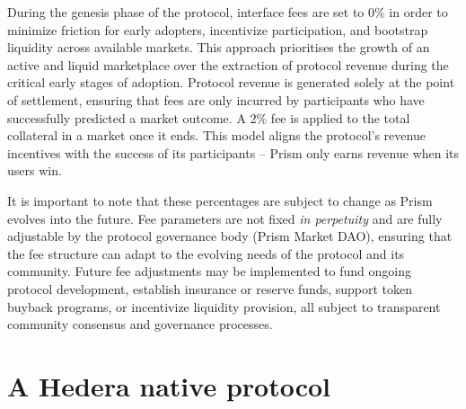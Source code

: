 \documentclass[11pt,a4paper]{article}
\begin{document}
During the genesis phase of the protocol, interface fees are set to 0\% in order to minimize friction for early adopters, incentivize participation, and bootstrap liquidity across available markets. This approach prioritises the growth of an active and liquid marketplace over the extraction of protocol revenue during the critical early stages of adoption. Protocol revenue is generated solely at the point of settlement, ensuring that fees are only incurred by participants who have successfully predicted a market outcome. A 2\% fee is applied to the total collateral in a market once it ends. This model aligns the protocol's revenue incentives with the success of its participants -- Prism only earns revenue when its users win. 

It is important to note that these percentages are subject to change as Prism evolves into the future. Fee parameters are not fixed \textit{in perpetuity} and are fully adjustable by the protocol governance body (Prism Market DAO), ensuring that the fee structure can adapt to the evolving needs of the protocol and its community. Future fee adjustments may be implemented to fund ongoing protocol development, establish insurance or reserve funds, support token buyback programs, or incentivize liquidity provision, all subject to transparent community consensus and governance processes.


\section{A Hedera native protocol}

\end{document}
